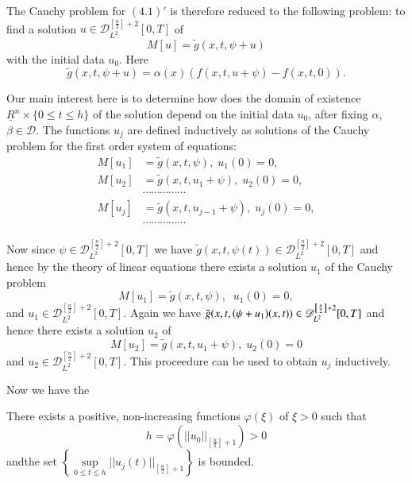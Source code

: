 The Cauchy problem for $(4.1)'$ is therefore reduced to the following
problem: to find a solution $u \in
\mathscr{D}^{\left[\frac{n}{2}\right]+2}_{L^2} [0, T]$ of  
$$
M[u]= \tilde{g}(x, t, \psi + u)
$$
with the initial data $u_0$. Here 
$$
\tilde{g}(x, t, \psi + u) = \alpha (x) (f(x, t, u + \psi) -f (x, t,
0)). 
$$

Our main interest here is to determine how does the domain of
existence $\underline{R}^n \times \{0 \leq t \leq h \}$ of the
solution depend on the initial data $u_0$, after fixing\pageoriginale
$\alpha$, $\beta \in \mathscr{D}$. The functions $u_j$ are
defined inductively as solutions of the Cauchy problem for the first
order system of equations:   
\begin{align*}
M[u_1] & = \tilde{g} (x, t, \psi ), \; u_1 (0) = 0, \\
M[u_2] & = \tilde{g} (x, t, u_1 + \psi ), \; u_2 (0) = 0, \\
& \cdots \cdots \cdots \cdots \cdots \\
M[u_j] & = \tilde{g}(x, t, u_{j - 1} + \psi ), \; u_j(0) = 0,\\
& \cdots \cdots \cdots \cdots \cdots 
\end{align*}

Now since $\psi \in
\mathscr{D}^{\left[\frac{n}{2}\right]+2}_{L^2} [0, 
  T]$ we have $\tilde{g}(x, t, \psi(t)) \in
\mathscr{D}^{\left[\frac{n}{2}\right] + 2}_{L^2} [0, T]$ and hence by
the theory of linear equations there exists a solution $u_1$ of the
Cauchy problem  
$$
M[u_1]  = \tilde{g} (x, t, \psi), \;\; u_1 (0) = 0,  
$$
and $u_1 \in \mathscr{D}^{\left[\frac{n}{2}\right]+2}_{L^2}[0,
  T]$. Again we have $\tilde{g}(x, t, (\psi + u_1) (x,t)) \in 
\mathscr{D}^{\left[\frac{n}{2}\right]+2}_{L^2}\break [0, T]$ and hence there
exists a solution $u_2$ of   
$$
M[u_2]= \tilde{g} (x, t, u_1 +\psi), \; u_2 (0) = 0 
$$
and $u_2 \in \mathscr{D}^{\left[\frac{n}{2}\right]+2}_{L^2}
[0, T]$. This proceedure can be used to obtain $u_j$ inductively.   

Now we have the 

\setcounter{proposition}{0}
\begin{proposition}\label{chap5-sec4-prop1} %
There exists a positive, non-increasing functions $\varphi (\xi )$ of
$\xi > 0$ such that  
$$
h = \varphi (|| u_0||_{\left[\frac{n}{2}\right]+1})> 0 
$$
and\pageoriginale the set $\left\{\sup\limits_{0 \leq t \leq h} || u_j (t)
||_{\left[\frac{n}{2}\right]+1} \right\}$ is bounded.  
\end{proposition}

